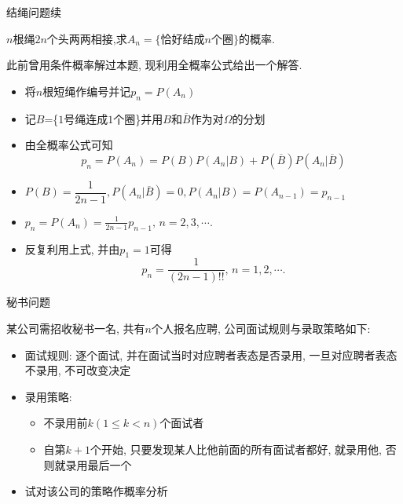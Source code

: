 \begin{frame}{结绳问题续}
	\begin{exam}
$n$根绳$2n$个头两两相接,求$A_n=\{\mbox{恰好结成}n\mbox{个圈}\}$的概率.
	\end{exam}

	\begin{jieda}
		此前曾用条件概率解过本题, 现利用全概率公式给出一个解答.
	\begin{itemize}[<+-|alert@+>]
		\item 将$n$根短绳作编号并记$p_n=P(A_n)$
		\item 记$B$=\{$1$号绳连成$1$个圈\}并用$B$和$\overline{B}$作为对$\Omega$的分划
		\item 由全概率公式可知
		$$p_n=P(A_n)=P(B)P(A_n|B)+P(\overline{B})P(A_n|\overline{B})$$
		\item $P(B)=\dfrac{1}{2n-1}, P(A_n|\overline{B})=0, P(A_n|B)=P(A_{n-1})=p_{n-1}$
		\item 	$p_n=P(A_n)=\frac{1}{2n-1}p_{n-1},\,n=2,3,\cdots.$
		\item 反复利用上式, 并由$p_1=1$可得
		$$p_n=\frac{1}{(2n-1)!!},\,n=1,2,\cdots.$$
	\end{itemize}

	\end{jieda}
\end{frame}



\begin{frame}{秘书问题}
	\begin{exam}
		某公司需招收秘书一名, 共有$n$个人报名应聘, 公司面试规则与录取策略如下:
		\begin{itemize}[<+-|alert@+>]
			\item 面试规则: 逐个面试, 并在面试当时对应聘者表态是否录用, 一旦对应聘者表态不录用, 不可改变决定
			\item 录用策略:
			\begin{itemize}[<+-|alert@+>]
				\item 不录用前$k(1\leq k<n)$个面试者
				\item 自第$k+1$个开始, 只要发现某人比他前面的所有面试者都好, 就录用他, 否则就录用最后一个
			\end{itemize}
		\item 试对该公司的策略作概率分析
		\end{itemize}
	\end{exam}
\end{frame}


